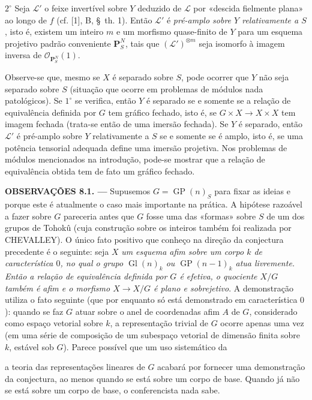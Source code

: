 \documentclass[11pt,twoside,openany]{book}
\numberwithin{equation}{section}
\newcommand{\src}[1]{%
  \phantomsection\hypertarget{src:#1}{}%
  \marginpar{\raggedleft\footnotesize\sffamily #1}%
}
\theoremstyle{plain}
\theoremstyle{definition}
\theoremstyle{remark}
\newcommand{\FgaUnitKey}{frontmatter}
\renewcommand{\src}[1]{%
  \phantomsection\hypertarget{src:\FgaUnitKey:#1}{}%
  \marginpar{\raggedleft\footnotesize\sffamily #1}%
}
\begin{document}
\smallskip
\noindent $2^\circ$ Seja $\mathcal L'$ o feixe invertível sobre $Y$ deduzido
de $\mathcal L$ por «descida fielmente plana» ao longo de $f$ (cf. [1], B,
\S~th. 1). Então $\mathcal L'$ é \emph{pré-amplo sobre $Y$ relativamente a
$S$}, isto é, existem um inteiro $m$ e um morfismo quase-finito de $Y$ para um
esquema projetivo padrão conveniente $\mathbf P_S^N$, tais que
$(\mathcal L')^{\otimes m}$ seja isomorfo à imagem inversa de
$\mathcal O_{\mathbf P_S^N}(1)$.

Observe-se que, mesmo se $X$ é separado sobre $S$, pode ocorrer que $Y$ não
seja separado sobre $S$ (situação que ocorre em problemas de módulos nada
patológicos). Se $1^\circ$ se verifica, então $Y$ é separado se e somente se a
relação de equivalência definida por $G$ tem gráfico fechado, isto é, se
$G\times X\to X\times X$ tem imagem fechada (trata-se então de uma imersão
fechada). Se $Y$ é separado, então $\mathcal L'$ é pré-amplo sobre $Y$
relativamente a $S$ se e somente se é amplo, isto é, se uma potência tensorial
adequada define uma imersão projetiva. Nos problemas de módulos mencionados na
introdução, pode-se mostrar que a relação de equivalência obtida tem de fato um
gráfico fechado.

\medskip
\noindent\textbf{OBSERVAÇÕES 8.1. ---} Supusemos
$G=\operatorname{GP}(n)_S$ para fixar as ideias e porque este é atualmente o
caso mais importante na prática. A hipótese razoável a fazer sobre $G$
pareceria antes que $G$ fosse uma das «formas» sobre $S$ de um dos grupos de
Tohokû (cuja construção sobre os inteiros também foi realizada por CHEVALLEY).
O único fato positivo que conheço na direção da conjectura precedente é o
seguinte: seja $X$ \emph{um esquema afim sobre um corpo $k$ de característica
$0$, no qual o grupo $\operatorname{Gl}(n)_k$ ou
$\operatorname{GP}(n-1)_k$ atua livremente. Então a relação de equivalência
definida por $G$ é efetiva, o quociente $X/G$ também é afim e o morfismo
$X\to X/G$ é plano e sobrejetivo}. A demonstração utiliza o fato seguinte (que
por enquanto só está demonstrado em característica $0$): quando se faz $G$
atuar sobre o anel de coordenadas afim $A$ de $G$, considerado como espaço
vetorial sobre $k$, a representação trivial de $G$ ocorre apenas uma vez (em
uma série de composição de um subespaço vetorial de dimensão finita sobre $k$,
estável sob $G$). Parece possível que um uso sistemático da
\src{118}
a teoria das representações lineares de $G$ acabará por fornecer uma
demonstração da conjectura, ao menos quando se está sobre um corpo de base.
Quando já não se está sobre um corpo de base, o conferencista nada sabe.
\end{document}
